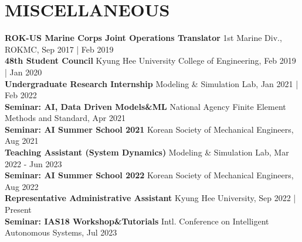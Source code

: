 \documentclass[a4paper,10pt]{extarticle}
\begin{document}
\section*{MISCELLANEOUS}
\textbf{ROK-US Marine Corps Joint Operations Translator} \hfill 1st Marine Div., ROKMC, Sep 2017 | Feb 2019\\
\textbf{48th Student Council} \hfill Kyung Hee University College of Engineering, Feb 2019 | Jan 2020\\
\textbf{Undergraduate Research Internship} \hfill Modeling \& Simulation Lab, Jan 2021 | Feb 2022\\
\textbf{Seminar: AI, Data Driven Models\&ML} \hfill {\small National Agency Finite Element Methods and Standard}, Apr 2021\\
\textbf{Seminar: AI Summer School 2021} \hfill Korean Society of Mechanical Engineers, Aug 2021\\
\textbf{Teaching Assistant (System Dynamics)} \hfill Modeling \& Simulation Lab, Mar 2022 - Jun 2023\\
\textbf{Seminar: AI Summer School 2022} \hfill Korean Society of Mechanical Engineers, Aug 2022\\
\textbf{Representative Administrative Assistant} \hfill Kyung Hee University, Sep 2022 | Present\\
\textbf{Seminar: IAS18 Workshop\&Tutorials} \hfill {\small Intl. Conference on Intelligent Autonomous Systems}, Jul 2023\\

\end{document}
